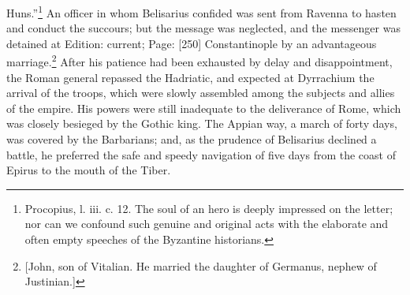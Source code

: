 Huns.\texthebrew{}”\footnote{Procopius, l. iii. c. 12. The soul of an hero is deeply impressed on the letter; nor can we confound such genuine and original acts with the elaborate and often empty speeches of the Byzantine historians.} An officer in whom Belisarius confided was sent from Ravenna to hasten and conduct the succours; but the message was neglected, and the messenger was detained at Edition: current; Page: [250] Constantinople by an advantageous marriage.\footnote{[John, son of Vitalian. He married the daughter of Germanus, nephew of Justinian.]} After his patience had been exhausted by delay and disappointment, the Roman general repassed the Hadriatic, and expected at Dyrrachium the arrival of the troops, which were slowly assembled among the subjects and allies of the empire. His powers were still inadequate to the deliverance of Rome, which was closely besieged by the Gothic king. The Appian way, a march of forty days, was covered by the Barbarians; and, as the prudence of Belisarius declined a battle, he preferred the safe and speedy navigation of five days from the coast of Epirus to the mouth of the Tiber.


